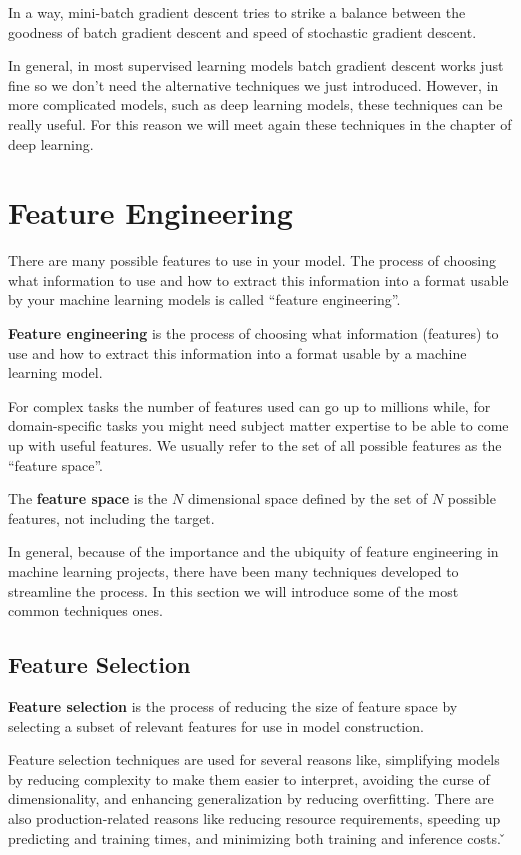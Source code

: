 In a way, mini-batch gradient descent tries to strike a balance between the goodness of batch gradient descent and
speed of stochastic gradient descent.
\eit

In general, in most supervised learning models batch gradient descent works just fine so we don't need the
alternative techniques we just introduced. However, in more complicated models, such as deep learning models, these
techniques can be really useful. For this reason we will meet again these techniques in the chapter of deep learning.

\section{Feature Engineering}

There are many possible features to use in your model. The process of choosing what information to use and how to
extract this information into a format usable by your machine learning models is called ``feature engineering''.

\textbf{Feature engineering} is the process of choosing what information (features) to use and how to extract this
information into a format usable by a machine learning model.
\ed

For complex tasks the number of features used can go up to millions while, for domain-specific tasks you might need
subject matter expertise to be able to come up with useful features. We usually refer to the set of all possible
features as the ``feature space''.

The \textbf{feature space} is the $N$ dimensional space defined by the set of $N$ possible features, not including
the target.
\ed

In general, because of the importance and the ubiquity of feature engineering in machine learning projects, there
have been many techniques developed to streamline the process. In this section we will introduce some of the most
common techniques ones.

\subsection{Feature Selection}

\textbf{Feature selection} is the process of reducing the size of feature space by selecting a subset of relevant
features for use in model construction.
\ed

Feature selection techniques are used for several reasons like, simplifying models by reducing complexity to make
them easier to interpret, avoiding the curse of dimensionality, and enhancing generalization by reducing overfitting.
There are also production-related reasons like reducing resource requirements, speeding up predicting and training
times, and minimizing both training and inference costs. \v

